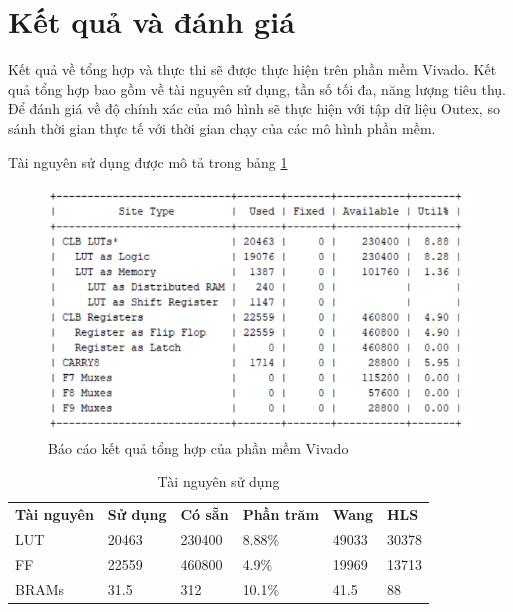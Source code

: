 \section{Kết quả và đánh giá}
Kết quả về tổng hợp và thực thi sẽ được thực hiện trên phần mềm Vivado. Kết quả tổng hợp bao gồm về tài nguyên sử dụng, tần số tối đa, năng lượng tiêu thụ. Để đánh giá về độ chính xác của mô hình sẽ thực hiện với tập dữ liệu Outex, so sánh thời gian thực tế với thời gian chạy của các mô hình phần mềm.

Tài nguyên sử dụng được mô tả trong bảng \ref{tab:resource}
\begin{figure}[!ht]
	\centering
	\includegraphics[width=\linewidth]{figures/synthesis_report.png}
	\caption{Báo cáo kết quả tổng hợp của phần mềm Vivado}
	\label{fig:synthesis_report}
\end{figure}
\begin{table}[H]
	\centering
	\renewcommand{\arraystretch}{1.3}
		\caption{Tài nguyên sử dụng}
	\begin{tabular}{|p{2cm} p{2cm} p{2cm} p{2cm} p{2cm} p{2cm}|}
		\hline
		\rowcolor{gray!30}
		\textbf{Tài nguyên} & \textbf{Sử dụng}  & \textbf{Có sẵn} & \textbf{Phần trăm} &  \textbf{Wang \cite{realTimeTexture}} & \textbf{HLS}  \\
		LUT & 20463 & 230400 & 8.88\% & 49033 & 30378
		\\ \hline
		FF & 22559 & 460800 & 4.9\% & 19969 & 13713
		\\ \hline
		BRAMs & 31.5 & 312 & 10.1\% & 41.5 & 88
		\\ \hline
	\end{tabular}

	\label{tab:resource}
\end{table}


